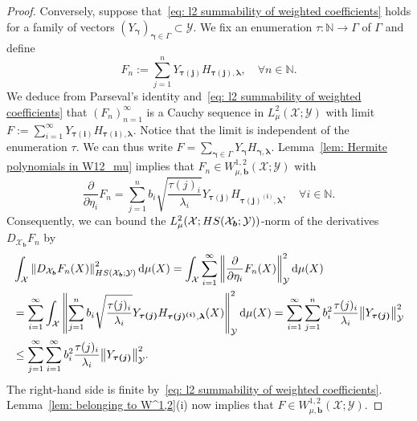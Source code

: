 \documentclass[namedate,webpdf]{ima-authoring-template-blank}
\def\D{\,\mathrm{d}}
\newcommand*{\HS}{\textup{HS}}
\newcommand*{\nm}[1]{{\left\|#1\right \|}}
\numberwithin{counter}{section}
\numberwithin{equation}{section}
\theoremstyle{plain}
\theoremstyle{definition}
\newcommand*{\cX}{\mathcal{X}}
\newcommand*{\cY}{\mathcal{Y}}
\newcommand*{\bbN}{\mathbb{N}}
\theoremstyle{thmstyletwo}
\begin{document}
\begin{proof}
    Conversely, suppose that~\eqref{eq: l2 summability of weighted coefficients} holds for a family of vectors \( (Y_{\bm{\gamma}})_{\bm{\gamma} \in \Gamma} \subset \cY \).
    We fix an enumeration \( \tau: \bbN \to \Gamma \) of \( \Gamma \) and define 
    \[
    F_n := \sum_{j = 1}^n Y_{\bm{\tau(j)}} H_{\bm{\tau(j)}, \bm{\lambda}}, \quad \forall n \in \bbN.
    \]
    We deduce from Parseval's identity and~\eqref{eq: l2 summability of weighted coefficients} that \( (F_n)_{n = 1}^{\infty} \) is a Cauchy sequence in \( L^2_{\mu}(\cX; \cY) \) with limit \( F := \sum_{i = 1}^{\infty} Y_{\bm{\tau(i)}} H_{\bm{\tau(i)}, \bm{\lambda}} \). Notice that the limit is independent of the enumeration \( \tau \). We can thus write \( F = \sum_{\bm{\gamma} \in \Gamma} Y_{\bm{\gamma}} H_{\bm{\gamma}, \bm{\lambda}} \).
    Lemma~\ref{lem: Hermite polynomials in W12_mu} implies that \( F_n \in W^{1,2}_{\mu, \bm{b}}(\cX; \cY) \) with 
    \[
    \frac{\partial}{\partial \eta_i} F_n = \sum_{j = 1}^n b_i \sqrt{\frac{\tau(j)_i}{\lambda_i}} Y_{\bm{\tau(j)}} H_{\bm{\tau(j)}^{\bm{(i)}}, \bm{\lambda}}, \quad \forall i \in \bbN.
    \]
    Consequently, we can bound the \( L_{\mu}^2(\cX; \HS(\cX_{\bm{b}}; \cY)) \)-norm of the derivatives \( D_{\cX_{\bm{b}}} F_n \) by
    \begin{align*}
        &\int_{\cX} \nm{D_{\cX_{\bm{b}}} F_n(X)}_{\HS(\cX_{\bm{b}};\cY)}^2 \D \mu(X)
        = \int_{\cX} \sum_{i = 1}^{\infty} \nm{\frac{\partial}{\partial \eta_i} F_n(X)}_{\cY}^2 \D \mu(X) \\
        &= \sum_{i = 1}^{\infty} \int_{\cX} \nm{\sum_{j = 1}^n b_i \sqrt{\frac{\tau(j)_i}{\lambda_i}} Y_{\bm{\tau(j)}} H_{\bm{\tau(j)}^{\bm{(i)}}, \bm{\lambda}}(X)}_{\cY}^2 \D \mu(X)
        = \sum_{i = 1}^{\infty} \sum_{j = 1}^n b_i^2 \frac{\tau(j)_i}{\lambda_i} \nm{Y_{\bm{\tau(j)}}}_{\cY}^2 \\
        &\leq \sum_{j = 1}^{\infty} \sum_{i = 1}^{\infty} b_i^2 \frac{\tau(j)_i}{\lambda_i} \nm{Y_{\bm{\tau(j)}}}_{\cY}^2.
    \end{align*}
    The right-hand side is finite by~\eqref{eq: l2 summability of weighted coefficients}. Lemma~\ref{lem: belonging to W^1,2}(i) now implies that \( F \in W_{\mu, \bm{b}}^{1, 2}(\cX; \cY) \).
\end{proof}
\end{document}
